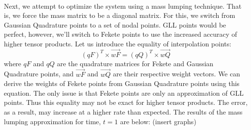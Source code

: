 \documentclass{article}
\begin{document}
\paragraph{}
Next, we attempt to optimize the system using a mass lumping technique. That is, we force the mass matrix to be a diagonal matrix. For this, we switch from Gaussian Quadrature points to a set of nodal points. GLL points would be perfect, however, we'll switch to Fekete points to use the increased accuracy of higher tensor products. Let us introduce the equality of interpolation points: 
\begin{equation*}
(qF)^T\times \vec{wF}=(qQ)^T\times \vec{wQ}
\end{equation*}
where $qF$ and $qQ$ are the quadrature matrices for Fekete and Gaussian Quadrature points, and $\vec{wF}$ and $\vec{wQ}$ are their respective weight vectors.
We can derive the weights of Fekete points from Gaussian Quadrature points using this equation. The only issue is that Fekete points are only an approximation of GLL points. Thus this equality may not be exact for higher tensor products. The error, as a result, may increase at a higher rate than expected. The results of the mass lumping approximation for time, $t=1$ are below: (insert graphs)
\end{document}
